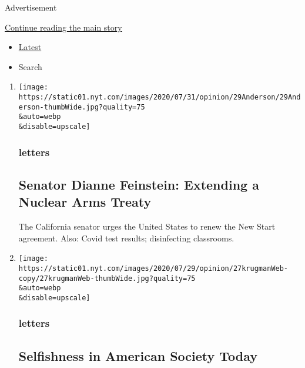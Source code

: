 Advertisement

\protect\hyperlink{after-mid1}{Continue reading the main story}

\begin{itemize}
\tightlist
\item
  \protect\hyperlink{stream-panel}{Latest}
\item
  Search
\end{itemize}

\begin{enumerate}
\def\labelenumi{\arabic{enumi}.}
\item
  \href{/2020/08/03/opinion/letters/nuclear-arms-treaty.html}{}

  \texttt{[image: https://static01.nyt.com/images/2020/07/31/opinion/29Anderson/29Anderson-thumbWide.jpg?quality=75\\\&auto=webp\\\&disable=upscale]}

  \hypertarget{letters}{%
  \subsubsection{letters}\label{letters}}

  \hypertarget{senator-dianne-feinstein-extending-a-nuclear-arms-treaty}{%
  \subsection{Senator Dianne Feinstein: Extending a Nuclear Arms
  Treaty}\label{senator-dianne-feinstein-extending-a-nuclear-arms-treaty}}

  The California senator urges the United States to renew the New Start
  agreement. Also: Covid test results; disinfecting classrooms.
\item
  \href{/2020/08/03/opinion/letters/selfishness-society.html}{}

  \texttt{[image: https://static01.nyt.com/images/2020/07/29/opinion/27krugmanWeb-copy/27krugmanWeb-thumbWide.jpg?quality=75\\\&auto=webp\\\&disable=upscale]}

  \hypertarget{letters-1}{%
  \subsubsection{letters}\label{letters-1}}

  \hypertarget{selfishness-in-american-society-today}{%
  \subsection{Selfishness in American Society
  Today}\label{selfishness-in-american-society-today}}


\end{enumerate}
